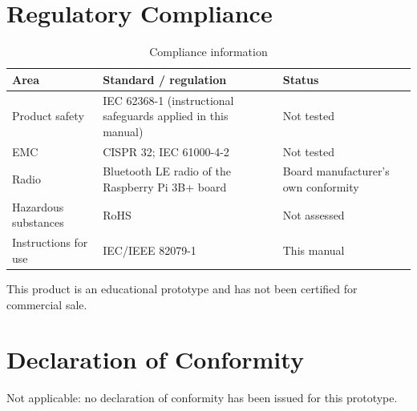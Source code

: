 \documentclass[11pt,a4paper,oneside]{report}
\newcommand{\hdr}[1]{\cellcolor{LightBlue}\textbf{#1}}
\begin{document}
\section{Regulatory Compliance}
\begin{table}[H]\centering\small
\caption{Compliance information}
\begin{tabularx}{\linewidth}{|l|X|l|}\hline
\hdr{Area} & \hdr{Standard / regulation} & \hdr{Status}\\ \hline
Product safety & IEC 62368-1 (instructional safeguards applied in this manual) & Not tested\\ \hline
EMC & CISPR 32; IEC 61000-4-2 & Not tested\\ \hline
Radio & Bluetooth LE radio of the Raspberry Pi 3B+ board & Board manufacturer's own conformity\\ \hline
Hazardous substances & RoHS & Not assessed\\ \hline
Instructions for use & IEC/IEEE 82079-1 & This manual\\ \hline
\end{tabularx}\end{table}
\begin{notice}
This product is an educational prototype and has not been certified for commercial sale.
\end{notice}

\section{Declaration of Conformity}
Not applicable: no declaration of conformity has been issued for this prototype.

\appendix
\end{document}
